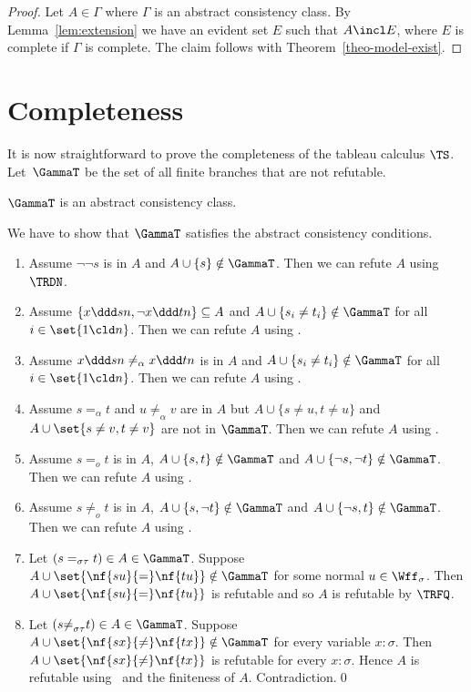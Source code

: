 \begin{proof}
  Let $A\in\Gamma$ where $\Gamma$ is an abstract
  consistency class.  By Lemma~\ref{lem:extension} we
  have an evident set $E$ such that $A\incl E$, where
  $E$ is complete if $\Gamma$ is complete.  The claim
  follows with Theorem~\ref{theo-model-exist}.
\end{proof}


\section{Completeness}
\label{sec:completeness}

It is now straightforward to prove the completeness of
the tableau calculus $\TS$. 
Let~\emph{$\GammaT$} be the
set of all finite branches that are not refutable.



\begin{lem}
  \label{lem:acc-completeness}
  $\GammaT$ is an abstract consistency class.
\end{lem}

\proof
    We have to show that $\GammaT$ satisfies the
    abstract consistency conditions.
\begin{enumerate}[\AMat]
\item[{\ADN}] Assume $\neg\neg s$ is in $A$ and
  $A\cup\{s\}\notin\GammaT$.  Then we can refute $A$
  using $\TRDN$.
\item[{\AMat}] Assume $\{x\ddd s n,\neg x\ddd t
  n\}\subseteq A$ and $A\cup\{s_i\neq
  t_i\}\notin\GammaT$ for all $i\in\set{1\cld n}$.
  Then we can refute $A$ using \TRMat.
\item[{\ADec}] Assume $x\ddd s n\neq_\alpha x\ddd t
  n$ is in $A$ and $A\cup\{s_i\neq t_i\}\notin\GammaT$
  for all $i\in\set{1\cld n}$.
  Then we can refute $A$ using \TRDec.
\item[{\ACon}] Assume $s=_\alpha t $ and
  $u\neq_\alpha v$ are in $A$ but $A\cup\{s\neq u,t\neq
  u\}$ and $A\cup{\set{s\neq v,t\neq v}}$ are not in
  $\GammaT$.  Then we can refute $A$ using \TRCon.
\item[{\ABQ}] Assume $s=_o t$ is in $A$,
  $A\cup\{s,t\}\notin\GammaT$ and $A\cup\{\neg s,\neg t\}\notin\GammaT$.
  Then we can refute $A$ using
  \TRBQ.
\item[{\ABE}] Assume $s\neq_o t$ is in $A$,
  $A\cup\{s,\neg t\}\notin\GammaT$ and $A\cup\{\neg
  s,t\}\notin\GammaT$.  Then we can refute $A$ using
  \TRBE.
\item[{\AFQ}] Let $(s=_{\sigma\tau}t)\in A\in\GammaT$.
  Suppose $A\cup\set{\nf{su}{=}\nf{tu}}\notin\GammaT$
  for some normal $u\in\Wff_\sigma$.  Then
  $A\cup\set{\nf{su}{=}\nf{tu}}$ is refutable and so
  $A$ is refutable by $\TRFQ$.
\item[{\AFE}] Let $(s{\neq}_{\sigma\tau}t)\in
  A\in\GammaT$.  Suppose
  $A\cup\set{\nf{sx}{\neq}\nf{tx}}\notin\GammaT$ for
  every variable $x:\sigma$.  Then
  $A\cup\set{\nf{sx}{\neq}\nf{tx}}$ is refutable for
  every $x:\sigma$.  Hence $A$ is refutable using~\TRFE
  and the finiteness of $A$.  Contradiction.\qed
\end{enumerate}

